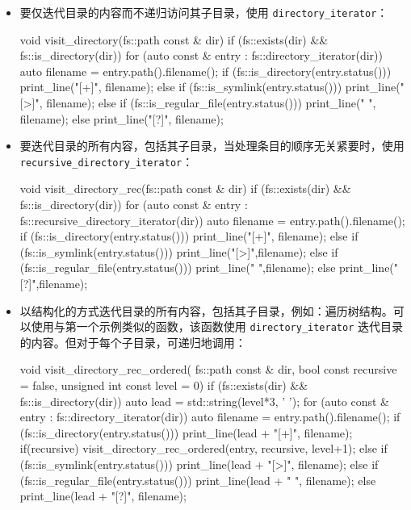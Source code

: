 \begin{itemize}
\item
要仅迭代目录的内容而不递归访问其子目录，使用 \verb|directory_iterator|：

\begin{cpp}
void visit_directory(fs::path const & dir)
{
    if (fs::exists(dir) && fs::is_directory(dir))
    {
        for (auto const & entry : fs::directory_iterator(dir))
        {
            auto filename = entry.path().filename();
            if (fs::is_directory(entry.status()))
                print_line("[+]", filename);
            else if (fs::is_symlink(entry.status()))
                print_line("[>]", filename);
            else if (fs::is_regular_file(entry.status()))
                print_line(" ", filename);
            else
                print_line("[?]", filename);
        }
    }
}
\end{cpp}

\item
要迭代目录的所有内容，包括其子目录，当处理条目的顺序无关紧要时，使用 \verb|recursive_directory_iterator|：

\begin{cpp}
void visit_directory_rec(fs::path const & dir)
{
    if (fs::exists(dir) && fs::is_directory(dir))
    {
        for (auto const & entry :
        fs::recursive_directory_iterator(dir))
        {
            auto filename = entry.path().filename();
            if (fs::is_directory(entry.status()))
                print_line("[+]", filename);
            else if (fs::is_symlink(entry.status()))
                print_line("[>]",filename);
            else if (fs::is_regular_file(entry.status()))
                print_line(" ",filename);
            else
                print_line("[?]",filename);
        }
    }
}
\end{cpp}

\item
以结构化的方式迭代目录的所有内容，包括其子目录，例如：遍历树结构。可以使用与第一个示例类似的函数，该函数使用 \verb|directory_iterator| 迭代目录的内容。但对于每个子目录，可递归地调用：

\begin{cpp}
void visit_directory_rec_ordered(
fs::path const & dir,
bool const recursive = false,
unsigned int const level = 0)
{
    if (fs::exists(dir) && fs::is_directory(dir))
    {
        auto lead = std::string(level*3, ' ');
        for (auto const & entry : fs::directory_iterator(dir))
        {
            auto filename = entry.path().filename();
            if (fs::is_directory(entry.status()))
            {
                print_line(lead + "[+]", filename);
                if(recursive)
                    visit_directory_rec_ordered(entry, recursive,
                level+1);
            }
            else if (fs::is_symlink(entry.status()))
                print_line(lead + "[>]", filename);
            else if (fs::is_regular_file(entry.status()))
                print_line(lead + " ", filename);
            else
                print_line(lead + "[?]", filename);
        }
    }
}
\end{cpp}
\end{itemize}


